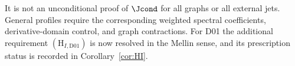 It is not an unconditional proof of \(\Jcond\) for all graphs
or all external jets.
General profiles require the corresponding weighted spectral
coefficients, derivative-domain control, and graph contractions.
For D01 the additional requirement
\((\mathrm H_{I,\mathrm{D01}})\) is now resolved in the Mellin
sense, and its prescription status is recorded in
Corollary~\ref{cor:HI}.
